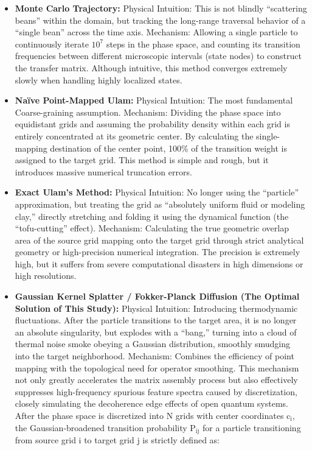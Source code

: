 \begin{itemize}
\item
  \textbf{Monte Carlo Trajectory:} Physical Intuition: This is not
  blindly ``scattering beans'' within the domain, but tracking the
  long-range traversal behavior of a ``single bean'' across the time
  axis. Mechanism: Allowing a single particle to continuously iterate
  \(\text{10}^{\text{7}}\) steps in the phase space, and counting its
  transition frequencies between different microscopic intervals (state
  nodes) to construct the transfer matrix. Although intuitive, this
  method converges extremely slowly when handling highly localized
  states.
\item
  \textbf{Naïve Point-Mapped Ulam:} Physical Intuition: The most
  fundamental Coarse-graining assumption. Mechanism: Dividing the phase
  space into equidistant grids and assuming the probability density
  within each grid is entirely concentrated at its geometric center. By
  calculating the single-mapping destination of the center point, 100\%
  of the transition weight is assigned to the target grid. This method
  is simple and rough, but it introduces massive numerical truncation
  errors.
\item
  \textbf{Exact Ulam's Method:} Physical Intuition: No longer using the
  ``particle'' approximation, but treating the grid as ``absolutely
  uniform fluid or modeling clay,'' directly stretching and folding it
  using the dynamical function (the ``tofu-cutting'' effect). Mechanism:
  Calculating the true geometric overlap area of the source grid mapping
  onto the target grid through strict analytical geometry or
  high-precision numerical integration. The precision is extremely high,
  but it suffers from severe computational disasters in high dimensions
  or high resolutions.
\item
  \textbf{Gaussian Kernel Splatter / Fokker-Planck Diffusion (The
  Optimal Solution of This Study):} Physical Intuition: Introducing
  thermodynamic fluctuations. After the particle transitions to the
  target area, it is no longer an absolute singularity, but explodes
  with a ``bang,'' turning into a cloud of thermal noise smoke obeying a
  Gaussian distribution, smoothly smudging into the target neighborhood.
  Mechanism: Combines the efficiency of point mapping with the
  topological need for operator smoothing. This mechanism not only
  greatly accelerates the matrix assembly process but also effectively
  suppresses high-frequency spurious feature spectra caused by
  discretization, closely simulating the decoherence edge effects of
  open quantum systems. After the phase space is discretized into
  \(\text{N}\) grids with center coordinates \(\text{c}_{\text{i}}\),
  the Gaussian-broadened transition probability \(\text{P}_{\text{ij}}\)
  for a particle transitioning from source grid \(\text{i}\) to target
  grid \(\text{j}\) is strictly defined as:
\end{itemize}

